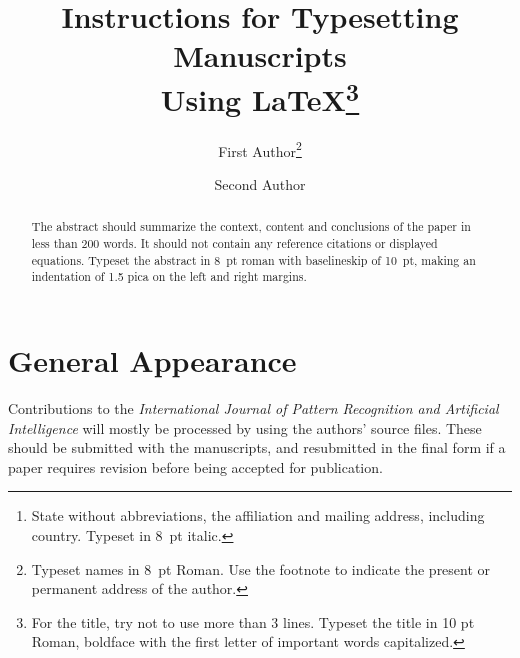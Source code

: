 \documentclass{ws-ijprai}
\begin{document}

%
\catchline{}{}{}{}{}
%

\title{Instructions for Typesetting Manuscripts \\
Using \LaTeX\footnote{For the title, try not to use
more than 3 lines. Typeset the title in 10 pt Roman, boldface with the first letter of important words capitalized.}}

\author{First Author\footnote{Typeset names in 8~pt Roman.
Use the footnote to indicate the present or permanent
address of the author.}}

\address{University Department, University Name, Address\\
City, State ZIP/Zone,Country\,\footnote{State without abbreviations,
the affiliation and mailing address, including country.
Typeset in 8~pt italic.}\\
}

\author{Second Author}

\address{Group, Laboratory, Address\\
City, State ZIP/Zone, Country\\
author\_id@domain\_name}

\maketitle

\begin{history}
\end{history}

\begin{abstract}
The abstract should summarize the context, content and conclusions of the paper in less than 200 words. It should not contain any reference citations or displayed equations. Typeset the abstract in 8~pt roman with baselineskip of 10~pt, making an indentation of 1.5 pica on the left and right margins.
\end{abstract}


\section{General Appearance}
Contributions to the {\it International Journal of Pattern Recognition and Artificial Intelligence} will mostly be processed by using the authors' source files. These should be submitted with the manuscripts, and resubmitted in the final form if a paper requires revision before being accepted for publication.
\end{document}
